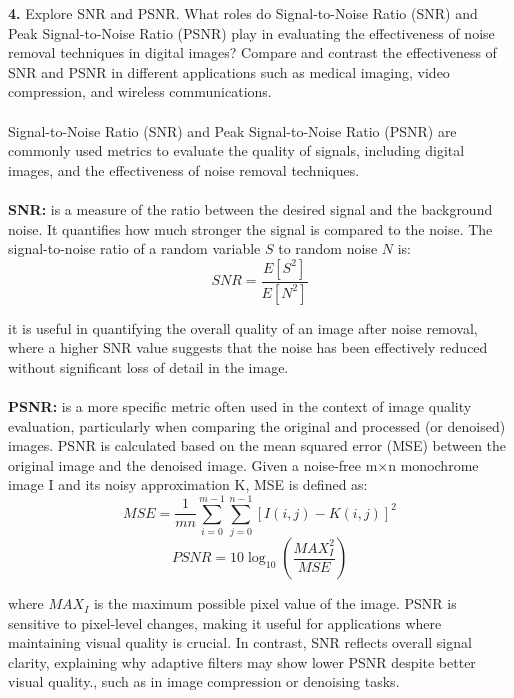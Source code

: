 \documentclass[hidelinks,12pt]{article}
\begin{document}
	 \textbf{4.} Explore SNR and PSNR. What roles do Signal-to-Noise Ratio (SNR) and Peak Signal-to-Noise Ratio (PSNR) play in evaluating the effectiveness of noise removal techniques in digital images? Compare and contrast the effectiveness of SNR and PSNR in different applications such as medical imaging, video compression, and wireless communications.
	\\ \\
	 Signal-to-Noise Ratio (SNR) and Peak Signal-to-Noise Ratio (PSNR) are commonly used metrics to evaluate the quality of signals, including digital images, and the effectiveness of noise removal techniques.
	\\ \\
	\textbf{SNR:} is a measure of the ratio between the desired signal and the background noise. It quantifies how much stronger the signal is compared to the noise. The signal-to-noise ratio of a random variable $S$ to random noise $N$ is:
	$$
	SNR = \frac{E[S^2]}{E[N^2]}
	$$
	
	 it is useful in quantifying the overall quality of an image after noise removal, where a higher SNR value suggests that the noise has been effectively reduced without significant loss of detail in the image.
	\\ \\
	\textbf{PSNR:} is a more specific metric often used in the context of image quality evaluation, particularly when comparing the original and processed (or denoised) images. PSNR is calculated based on the mean squared error (MSE) between the original image and the denoised image. Given a noise-free m×n monochrome image I and its noisy approximation K, MSE is defined as:
	$$
	MSE = \frac{1}{mn} \sum_{i=0}^{m-1} \sum_{j=0}^{n-1} [I(i,j) - K(i,j)]^2
	$$
	$$
	PSNR = 10 \log_{10}(\frac{MAX_I^2}{MSE})
	$$
	
	 where $MAX_I$ is the maximum possible pixel value of the image. PSNR is sensitive to pixel-level changes, making it useful for applications where maintaining visual quality is crucial. In contrast, SNR reflects overall signal clarity, explaining why adaptive filters may show lower PSNR despite better visual quality., such as in image compression or denoising tasks.
	\pagebreak
	
\end{document}
